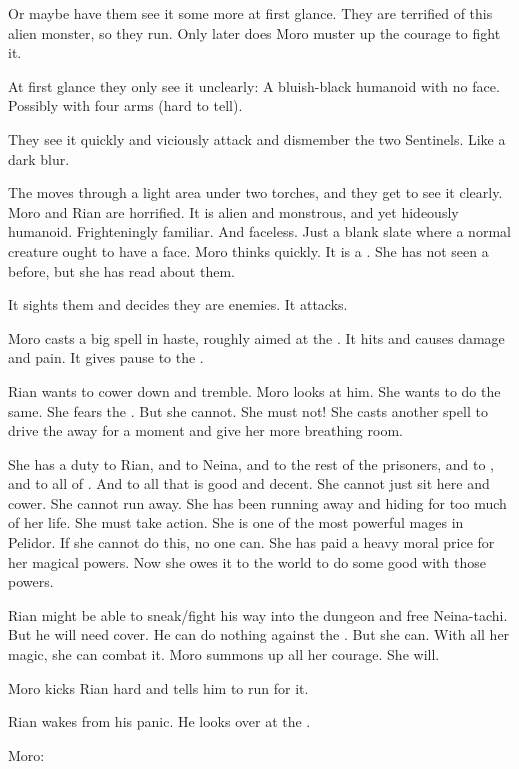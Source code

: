 Or maybe have them see it some more at first glance.
They are terrified of this alien monster, so they run.
Only later does Moro muster up the courage to fight it. 

At first glance they only see it unclearly:
A bluish-black humanoid with no face.
Possibly with four arms (hard to tell). 

They see it quickly and viciously attack and dismember the two Sentinels.
Like a dark blur. 

The \bane moves through a light area under two torches, and they get to see it clearly. 
Moro and Rian are horrified. 
It is alien and monstrous, and yet hideously humanoid. 
Frighteningly familiar.
And faceless. 
Just a blank slate where a normal creature ought to have a face. 
Moro thinks quickly. 
It is a \bane. 
She has not seen a \bane before, but she has read about them.

It sights them and decides they are enemies.
It attacks. 

Moro casts a big spell in haste, roughly aimed at the \bane. 
It hits and causes damage and pain.
It gives pause to the \bane. 

Rian wants to cower down and tremble. 
Moro looks at him. 
She wants to do the same. 
She fears the \bane. 
But she cannot. 
She must not! 
She casts another spell to drive the \bane away for a moment and give her more breathing room. 

She has a duty to Rian, and to Neina, and to the rest of the prisoners, and to \Tiroco, and to all of \Malcur. 
And to all that is good and decent.
She cannot just sit here and cower.
She cannot run away.
She has been running away and hiding for too much of her life.
She must take action. 
She is one of the most powerful mages in Pelidor. 
If she cannot do this, no one can. 
She has paid a heavy moral price for her magical powers.
Now she owes it to the world to do some good with those powers. 

Rian might be able to sneak/fight his way into the dungeon and free Neina-tachi. 
But he will need cover. 
He can do nothing against the \bane. 
But she can. 
With all her magic, she can combat it. 
Moro summons up all her courage. 
She will. 

Moro kicks Rian hard and tells him to run for it.

Rian wakes from his panic. 
He looks over at the \bane. 

Moro:





